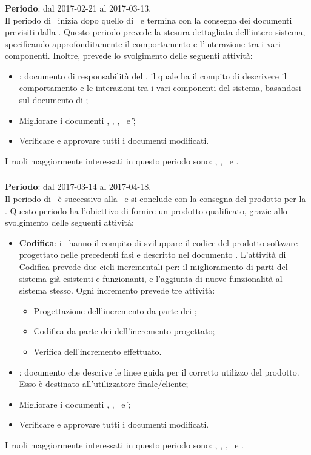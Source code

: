 		\subsubsection{\PD}
		\textbf{Periodo}: dal 2017-02-21 al 2017-03-13.\\
		Il periodo di \PD\ inizia dopo quello di \PA\ e termina con la consegna dei documenti previsiti dalla \RP. Questo periodo prevede la stesura dettagliata dell’intero sistema, specificando approfonditamente
		il comportamento e l’interazione tra i vari componenti.
		Inoltre, prevede lo svolgimento delle seguenti attività:
		\begin{itemize}
			\item \textit{\DDP}: documento di responsabilità del \Prog, il quale ha il compito di descrivere il comportamento	e le interazioni tra i vari componenti del sistema, basandosi sul documento di \ST;
			\item  Migliorare i documenti \NdP, \PdP, \PdQ, \ST\ e \G;
			\item Verificare e approvare tutti i documenti modificati.
		\end{itemize}
		I ruoli maggiormente interessati in questo periodo sono: \Amm, \Res, \Prog\ e \Ver.
		
		\subsubsection{\CO}
		\textbf{Periodo}: dal 2017-03-14 al 2017-04-18.\\
		Il periodo di \CO\ è successivo alla \PD\ e si conclude con la consegna	del prodotto per la \RQ. Questo periodo ha l'obiettivo di fornire un prodotto qualificato, grazie allo svolgimento delle seguenti attività:
		\begin{itemize}
			\item \textbf{Codifica}: i \Progrs\ hanno il compito di sviluppare il codice del prodotto software progettato nelle precedenti fasi e descritto nel documento \DDP. L’attività di Codifica prevede due cicli incrementali per: il miglioramento
			di parti del sistema già esistenti e funzionanti, e l’aggiunta di nuove funzionalità al sistema stesso.
			Ogni incremento prevede tre attività:
			\begin{itemize}
				\item Progettazione dell’incremento da parte dei \Progs;
				\item Codifica da parte dei \Progrs dell’incremento progettato;
				\item Verifica dell’incremento effettuato.
			\end{itemize}
			\item \textit{\MU}: documento che descrive le linee guida per il corretto utilizzo del prodotto. Esso è destinato all’utilizzatore finale/cliente;
			\item  Migliorare i documenti \NdP, \PdP, \PdQ\ e \G;
			\item Verificare e approvare tutti i documenti modificati.
		\end{itemize}
		I ruoli maggiormente interessati in questo periodo sono: \Amm, \Res, \Prog, \Progr\ e \Ver.
		
